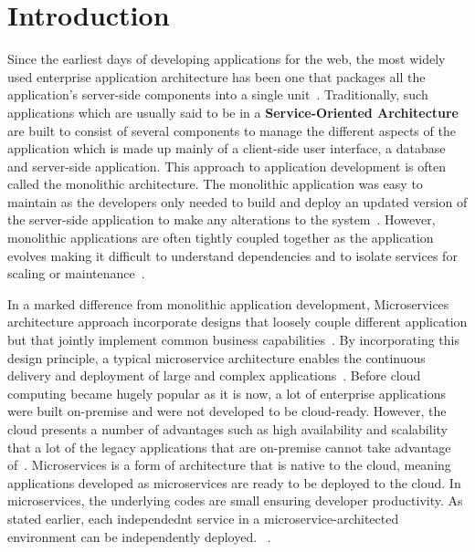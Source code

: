

\maketitle


\section{Introduction}

Since the earliest days of developing applications for the web, the
most widely used enterprise application architecture has been one that
packages all the application's server-side components into a single
unit~\cite{hid-sp18-501-infoq}. Traditionally, such applications which
are usually said to be in a {\bf Service-Oriented Architecture} are built
to consist of several components to manage the different aspects of
the application which is made up mainly of a client-side user
interface, a database and server-side application. This approach to
application development is often called the monolithic
architecture. The monolithic application was easy to maintain as the
developers only needed to build and deploy an updated version of the
server-side application to make any alterations to the
system~\cite{hid-sp18-501-mulesoft}. However, monolithic applications
are often tightly coupled together as the application evolves making
it difficult to understand dependencies and to isolate services for
scaling or maintenance~\cite{hid-sp18-501-trello}.
 
In a marked difference from monolithic application development,
Microservices architecture approach incorporate designs
that loosely couple different application but that jointly implement
common business capabilities~\cite{hid-sp18-501-microservicesio}. 
By incorporating this design principle, a typical microservice
architecture enables the continuous delivery and deployment of large and
complex applications~\cite{hid-sp18-501-researchgate}. 
Before cloud computing became hugely popular as it
is now, a lot of enterprise applications were built on-premise and
were not developed to be cloud-ready. However, the cloud presents a
number of advantages such as high availability and scalability that a
lot of the legacy applications that are on-premise cannot take
advantage of~\cite{hid-sp18-501-springer}. Microservices is a form of
architecture that is native to the cloud, meaning applications
developed as microservices are ready to be deployed to the cloud. In
microservices, the underlying codes are small ensuring developer
productivity. As stated earlier, each independednt service in a 
microservice-architected environment can be independently deployed.
~\cite{hid-sp18-501-infoq}.

